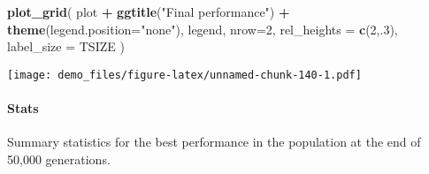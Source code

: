 \documentclass[]{book}
\newenvironment{Shaded}{\begin{snugshade}}{\end{snugshade}}
\newcommand{\DataTypeTok}[1]{\textcolor[rgb]{0.13,0.29,0.53}{#1}}
\newcommand{\DecValTok}[1]{\textcolor[rgb]{0.00,0.00,0.81}{#1}}
\newcommand{\KeywordTok}[1]{\textcolor[rgb]{0.13,0.29,0.53}{\textbf{#1}}}
\newcommand{\NormalTok}[1]{#1}
\newcommand{\OperatorTok}[1]{\textcolor[rgb]{0.81,0.36,0.00}{\textbf{#1}}}
\newcommand{\OtherTok}[1]{\textcolor[rgb]{0.56,0.35,0.01}{#1}}
\newcommand{\StringTok}[1]{\textcolor[rgb]{0.31,0.60,0.02}{#1}}
\let\oldparagraph\paragraph
\renewcommand{\paragraph}[1]{\oldparagraph{#1}\mbox{}}
\begin{document}
\begin{Shaded}
\begin{Highlighting}[]
\KeywordTok{plot_grid}\NormalTok{(}
\NormalTok{  plot }\OperatorTok{+}
\StringTok{    }\KeywordTok{ggtitle}\NormalTok{(}\StringTok{"Final performance"}\NormalTok{) }\OperatorTok{+}
\StringTok{    }\KeywordTok{theme}\NormalTok{(}\DataTypeTok{legend.position=}\StringTok{"none"}\NormalTok{),}
\NormalTok{  legend,}
  \DataTypeTok{nrow=}\DecValTok{2}\NormalTok{,}
  \DataTypeTok{rel_heights =} \KeywordTok{c}\NormalTok{(}\DecValTok{2}\NormalTok{,.}\DecValTok{3}\NormalTok{),}
  \DataTypeTok{label_size =}\NormalTok{ TSIZE}
\NormalTok{)}
\end{Highlighting}
\end{Shaded}

\texttt{[image: demo\_files/figure-latex/unnamed-chunk-140-1.pdf]}

\hypertarget{stats-27}{%
\paragraph{Stats}\label{stats-27}}

Summary statistics for the best performance in the population at the end of 50,000 generations.

\begin{Shaded}
\end{Shaded}
\end{document}
